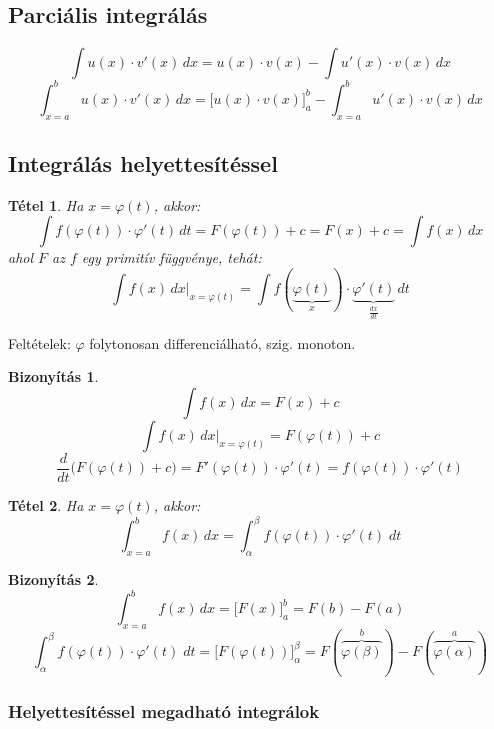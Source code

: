 \documentclass[a4paper,12pt,twoside]{book}
\newtheorem{tetel}{Tétel}[chapter]
\theoremstyle{break}
\newtheorem{biz}{Bizonyítás}[chapter]
\theoremstyle{plain}
\newtheorem{bizNoNL}[biz]{Bizonyítás}
\newcommand{\integ}[1]{\ensuremath{\int #1\, dx}}
\newcommand{\integDT}[1]{\ensuremath{\int #1\, dt}}
\newcommand{\hatInteg}[3]{\ensuremath{\int^{#2}_{x=#1} #3\, dx}}
\begin{document}
\subsection{Parciális integrálás}

\[\integ{u(x)\cdot v'(x)} = u(x)\cdot v(x)-\integ{u'(x)\cdot v(x)}\]
\[\hatInteg{a}{b}{u(x)\cdot v'(x)} = \Big[u(x)\cdot v(x)\Big]^{b}_{a}-\hatInteg{a}{b}{u'(x)\cdot v(x)}\]

\subsection{Integrálás helyettesítéssel}

\begin{tetel}
Ha $x=\varphi(t)$, akkor:
\[\integDT{f(\varphi(t))\cdot \varphi'(t)} = F(\varphi(t))+c = F(x)+c = \integ{f(x)}\]
ahol $F$ az $f$ egy primitív függvénye, tehát:
\[\integ{f(x)}\Big|_{x=\varphi(t)} = \integDT{f(\underbrace{\varphi(t)}_{x})\cdot\underbrace{\varphi'(t)}_{\frac{dx}{dt}}}\]
\end{tetel}
Feltételek: $\varphi$ folytonosan differenciálható, szig. monoton.
\begin{bizNoNL}
 \[\integ{f(x)} = F(x)+c\]
 \[\integ{f(x)}\Big|_{x=\varphi(t)} = F(\varphi(t))+c\]
 \[\frac{d}{dt}\Big(F(\varphi(t))+c\Big) = F'(\varphi(t))\cdot \varphi'(t) = f(\varphi(t))\cdot \varphi'(t)\]
\end{bizNoNL}

\begin{tetel}
Ha $x=\varphi(t)$, akkor:
\[\hatInteg{a}{b}{f(x)} = \int^{\beta}_{\alpha}f(\varphi(t))\cdot\varphi'(t)\; dt\]
\end{tetel}
\begin{biz}
 \[\hatInteg{a}{b}{f(x)} = \Big[F(x)\Big]^{b}_{a} = F(b)-F(a)\]
 \[\int^{\beta}_{\alpha}f(\varphi(t))\cdot\varphi'(t)\; dt = \Big[F(\varphi(t))\Big]^{\beta}_{\alpha} = F(\overbrace{\varphi(\beta)}^{b})-F(\overbrace{\varphi(\alpha)}^{a})\]
\end{biz}

\subsubsection{Helyettesítéssel megadható integrálok}
\end{document}
